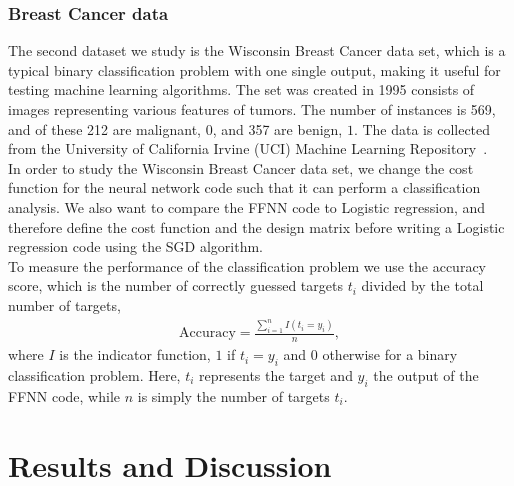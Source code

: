 \documentclass[english,notitlepage,reprint,nofootinbib]{revtex4-2}  %
\begin{document}
\subsubsection*{Breast Cancer data}
The second dataset we study is the Wisconsin Breast Cancer data set, which is a typical binary classification problem with one single output, making it useful for testing machine learning algorithms. The set was created in 1995 consists of images representing various features of tumors. The number of instances is 569, and of these 212 are malignant, $0$, and 357 are benign, $1$. The data is collected from the University of California Irvine (UCI) Machine Learning Repository~\cite{BreastCancerData}. 
\vspace{3mm}
\\ 
In order to study the Wisconsin Breast Cancer data set, we change the cost function for the neural network code such that it can perform a classification analysis. We also want to compare the FFNN code to Logistic regression, and therefore define the cost function and the design matrix before writing a Logistic regression code using the SGD algorithm. 
\vspace{3mm}
\\ 
To measure the performance of the classification problem we use the accuracy score, which is the number of correctly guessed targets $t_i$ divided by the total number of targets, 
\begin{align*}
    \text{Accuracy} = \frac{\sum^n_{i=1} I(t_i=y_i)}{n}, 
\end{align*}
where $I$ is the indicator function, $1$ if $t_i=y_i$ and $0$ otherwise for a binary classification problem. Here, $t_i$ represents the target and $y_i$ the output of the FFNN code, while $n$ is simply the number of targets $t_i$. 




\section{Results and Discussion}\label{sec:results}
\end{document}
